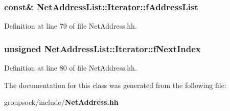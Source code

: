 \subsubsection[{f\+Address\+List}]{ const\& Net\+Address\+List\+::\+Iterator\+::f\+Address\+List\hspace{0.3cm}{\ttfamily [private]}}\label{classNetAddressList_1_1Iterator_a9e9dd10bb581e40c8bb07cc9263563a6}


Definition at line 79 of file Net\+Address.\+hh.

\subsubsection[{f\+Next\+Index}]{\setlength{\rightskip}{0pt plus 5cm}unsigned Net\+Address\+List\+::\+Iterator\+::f\+Next\+Index\hspace{0.3cm}{\ttfamily [private]}}\label{classNetAddressList_1_1Iterator_a98df8b9081edab779c4333b4a588ccfe}


Definition at line 80 of file Net\+Address.\+hh.



The documentation for this class was generated from the following file\+:\begin{DoxyCompactItemize}
\item 
groupsock/include/{\bf Net\+Address.\+hh}\end{DoxyCompactItemize}
